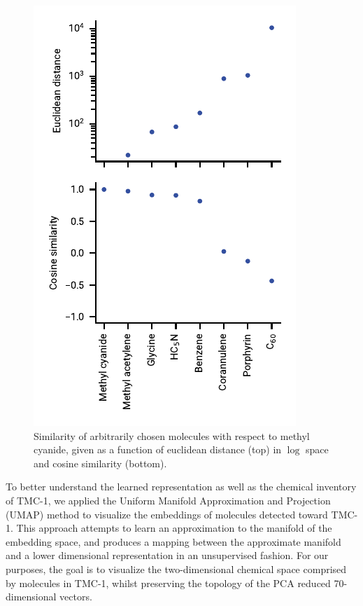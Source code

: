 \documentclass[twocolumn]{aastex63}
\begin{document}
\begin{figure}
    \centering
    \includegraphics{cosine_similarity.pdf}
    \caption{Similarity of arbitrarily chosen molecules with respect to methyl cyanide, given as a function of euclidean distance (top) in $\log$ space and cosine similarity (bottom).}
    \label{fig:cosine}
\end{figure}

To better understand the learned representation as well as the chemical inventory of TMC-1, we applied the Uniform Manifold Approximation and Projection (UMAP) method \citep{mcinnes_umap_2020} to visualize the embeddings of molecules detected toward TMC-1. This approach attempts to learn an approximation to the manifold of the embedding space, and produces a mapping between the approximate manifold and a lower dimensional representation in an unsupervised fashion. For our purposes, the goal is to visualize the two-dimensional chemical space comprised by molecules in TMC-1, whilst preserving the topology of the PCA reduced 70-dimensional vectors. 
\end{document}
